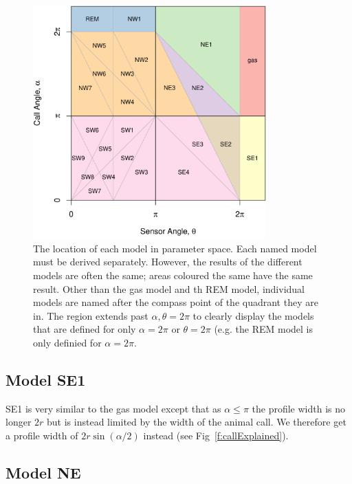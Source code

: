 \begin{figure}[t]
\centering
\includegraphics[width=0.8\textwidth]{../imgs/equalRegions.pdf}
\caption{The location of each model in parameter space. Each named model must be derived separately. However, the results of the different models are often the same; areas coloured the same have the same result. Other than the gas model and th REM model, individual models are named after the compass point of the quadrant they are in. The region extends past $\alpha, \theta=2\pi$ to clearly display the models that are defined for only $\alpha=2\pi$ or $\theta=2\pi$ (e.g. the REM model is only definied for $\alpha=2\pi$.}
\label{f:equalRegions}
\end{figure}


\subsection{Model SE1} \label{SE1}

SE1 is very similar to the gas model except that as $\alpha \le \pi$ the profile width is no longer $2r$ but is instead limited by the width of the animal call. We therefore get a profile width of $2r\sin(\alpha/2)$ instead (see Fig~\ref{f:callExplained}).



\subsection{Model NE} \label{NE}

